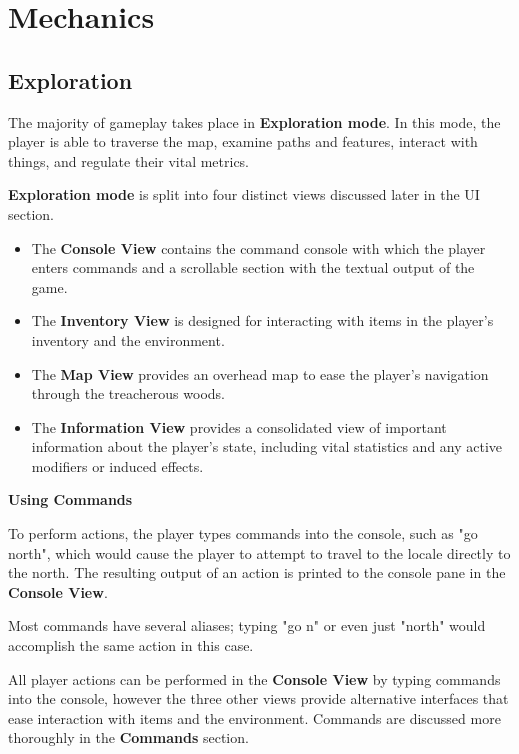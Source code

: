 \documentclass[11pt]{article}
\begin{document}
	\section{Mechanics}
	
	\subsection{Exploration}
	
	The majority of gameplay takes place in \textbf{Exploration mode}. In this mode, the player is able to traverse the map, examine paths and features, interact with things, and regulate their vital metrics.
	
	\textbf{Exploration mode} is split into four distinct views discussed later in the UI section.
	
	\begin{itemize}
		\item The \textbf{Console View} contains the command console with which the player enters commands and a scrollable section with the textual output of the game.
		\item The \textbf{Inventory View} is designed for interacting with items in the player's inventory and the environment.
		\item The \textbf{Map View} provides an overhead map to ease the player's navigation through the treacherous woods.
		\item The \textbf{Information View} provides a consolidated view of important information about the player's state, including vital statistics and any active modifiers or induced effects.
	\end{itemize}

	\textbf{Using Commands}
	\newline
	
	To perform actions, the player types commands into the console, such as "go north", which would cause the player to attempt to travel to the locale directly to the north. The resulting output of an action is printed to the console pane in the \textbf{Console View}.
	
	Most commands have several aliases; typing "go n" or even just "north" would accomplish the same action in this case.
	
	All player actions can be performed in the \textbf{Console View} by typing commands into the console, however the three other views provide alternative interfaces that ease interaction with items and the environment. Commands are discussed more thoroughly in the \textbf{Commands} section.\linebreak
	
\end{document}
